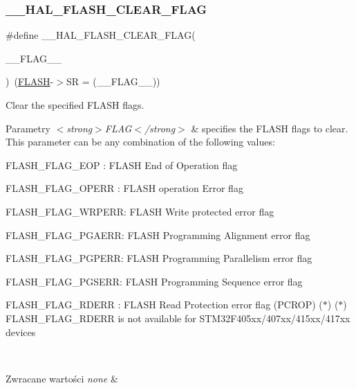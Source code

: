 \subsubsection{\texorpdfstring{\+\_\+\+\_\+\+H\+A\+L\+\_\+\+F\+L\+A\+S\+H\+\_\+\+C\+L\+E\+A\+R\+\_\+\+F\+L\+AG}{\_\_HAL\_FLASH\_CLEAR\_FLAG}}
{\footnotesize\ttfamily \#define \+\_\+\+\_\+\+H\+A\+L\+\_\+\+F\+L\+A\+S\+H\+\_\+\+C\+L\+E\+A\+R\+\_\+\+F\+L\+AG(\begin{DoxyParamCaption}\item[{}]{\+\_\+\+\_\+\+F\+L\+A\+G\+\_\+\+\_\+ }\end{DoxyParamCaption})~(\hyperlink{group___peripheral__declaration_ga844ea28ba1e0a5a0e497f16b61ea306b}{F\+L\+A\+SH}-\/$>$SR = (\+\_\+\+\_\+\+F\+L\+A\+G\+\_\+\+\_\+))}



Clear the specified F\+L\+A\+SH flags. 


\begin{DoxyParams}{Parametry}
{\em $<$strong$>$\+F\+L\+A\+G$<$/strong$>$} & specifies the F\+L\+A\+SH flags to clear. This parameter can be any combination of the following values\+: \begin{DoxyItemize}
\item F\+L\+A\+S\+H\+\_\+\+F\+L\+A\+G\+\_\+\+E\+OP \+: F\+L\+A\+SH End of Operation flag \item F\+L\+A\+S\+H\+\_\+\+F\+L\+A\+G\+\_\+\+O\+P\+E\+RR \+: F\+L\+A\+SH operation Error flag \item F\+L\+A\+S\+H\+\_\+\+F\+L\+A\+G\+\_\+\+W\+R\+P\+E\+RR\+: F\+L\+A\+SH Write protected error flag \item F\+L\+A\+S\+H\+\_\+\+F\+L\+A\+G\+\_\+\+P\+G\+A\+E\+RR\+: F\+L\+A\+SH Programming Alignment error flag \item F\+L\+A\+S\+H\+\_\+\+F\+L\+A\+G\+\_\+\+P\+G\+P\+E\+RR\+: F\+L\+A\+SH Programming Parallelism error flag \item F\+L\+A\+S\+H\+\_\+\+F\+L\+A\+G\+\_\+\+P\+G\+S\+E\+RR\+: F\+L\+A\+SH Programming Sequence error flag \item F\+L\+A\+S\+H\+\_\+\+F\+L\+A\+G\+\_\+\+R\+D\+E\+RR \+: F\+L\+A\+SH Read Protection error flag (P\+C\+R\+OP) ($\ast$) ($\ast$) F\+L\+A\+S\+H\+\_\+\+F\+L\+A\+G\+\_\+\+R\+D\+E\+RR is not available for S\+T\+M32\+F405xx/407xx/415xx/417xx devices \end{DoxyItemize}
\\
\hline
\end{DoxyParams}

\begin{DoxyRetVals}{Zwracane wartości}
{\em none} & \\
\hline
\end{DoxyRetVals}


